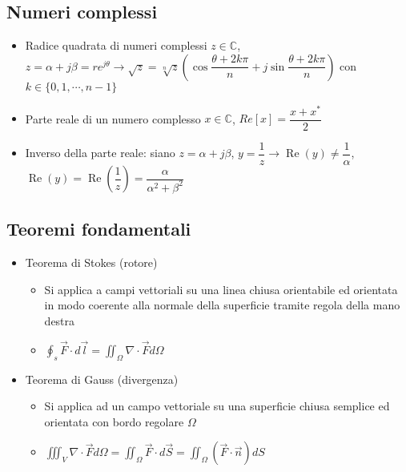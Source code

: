 \documentclass{article}
\begin{document}
\subsection{Numeri complessi}
\begin{itemize}
	\item Radice quadrata di numeri complessi \(z \in \mathbb{C}\), \\ \( z = \alpha + j \beta = r e^{j \theta} \rightarrow \sqrt{z} = \sqrt[n]{z} \left( \cos{\dfrac{\theta + 2k\pi}{n}} + j \sin{\dfrac{\theta + 2 k \pi}{n}} \right) \) \newline con \(k \in \{0, 1, \cdots, n-1 \} \)
	\item Parte reale di un numero complesso \(x \in \mathbb{C}\), \(Re[x] = \dfrac{x + x^{*}}{2} \)
	\item Inverso della parte reale: siano \(z = \alpha + j \beta \), \(y = \dfrac{1}{z} \rightarrow \operatorname{Re}(y) \neq \dfrac{1}{\alpha}\), \(\operatorname{Re}(y) = \operatorname{Re}\left(\dfrac{1}{z}\right) = \dfrac{\alpha}{\alpha^2 + \beta^2}\)
\end{itemize}

\subsection{Teoremi fondamentali}
\begin{itemize}
	\item Teorema di Stokes (rotore)
	\begin{itemize}
		\item Si applica a campi vettoriali su una linea chiusa orientabile ed orientata in modo coerente alla normale della superficie tramite regola della mano destra
		\item \( \displaystyle \oint_s \vec{F} \cdot d\vec{l} = \iint_\Omega \nabla \cdot \vec{F} d\Omega \)
	\end{itemize}	 
	\item Teorema di Gauss (divergenza)
	\begin{itemize}
		\item Si applica ad un campo vettoriale su una superficie chiusa semplice ed orientata con bordo regolare \( \Omega \)
		\item \( \displaystyle \iiint_V \nabla \cdot \vec{F} d\Omega = \iint_\Omega \vec{F} \cdot d\vec{S} = \iint_\Omega \left( \vec{F} \cdot \vec{n} \right) dS \)
	\end{itemize}
\end{itemize}
\end{document}
